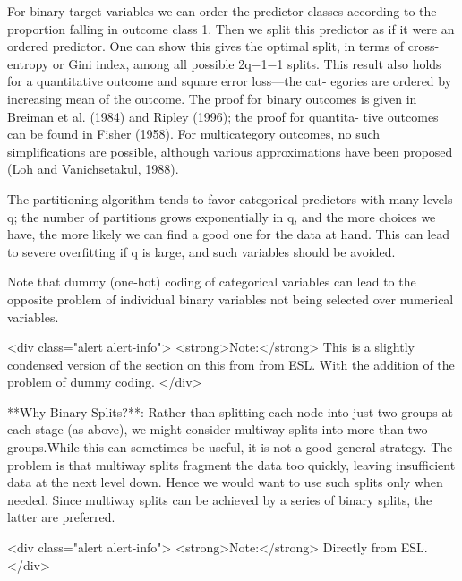 For binary target variables we can order the predictor classes according to the
proportion falling in outcome class 1. Then we split this predictor as if it
were an ordered predictor. One can show this gives the optimal split, in
terms of cross-entropy or Gini index, among all possible 2q−1−1 splits. This
result also holds for a quantitative outcome and square error loss—the cat-
egories are ordered by increasing mean of the outcome. The proof for binary outcomes
is given in Breiman et al. (1984) and Ripley (1996); the proof for quantita-
tive outcomes can be found in Fisher (1958). For multicategory outcomes,
no such simplifications are possible, although various approximations have
been proposed (Loh and Vanichsetakul, 1988).

The partitioning algorithm tends to favor categorical predictors with
many levels q; the number of partitions grows exponentially in q, and the
more choices we have, the more likely we can find a good one for the data
at hand. This can lead to severe overfitting if q is large, and such variables
should be avoided.

Note that dummy (one-hot) coding of categorical variables can lead to the opposite problem of individual binary variables not being selected over numerical variables.

<div class="alert alert-info">
  <strong>Note:</strong> This is a slightly condensed version of the section on this from from ESL. With the addition of the problem of dummy coding.
</div>  

**Why Binary Splits?**: Rather than splitting each node into just two groups at each stage (as
above), we might consider multiway splits into more than two groups.While
this can sometimes be useful, it is not a good general strategy. The problem
is that multiway splits fragment the data too quickly, leaving insufficient
data at the next level down. Hence we would want to use such splits only
when needed. Since multiway splits can be achieved by a series of binary
splits, the latter are preferred.

<div class="alert alert-info">
  <strong>Note:</strong> Directly from ESL.
</div>  

